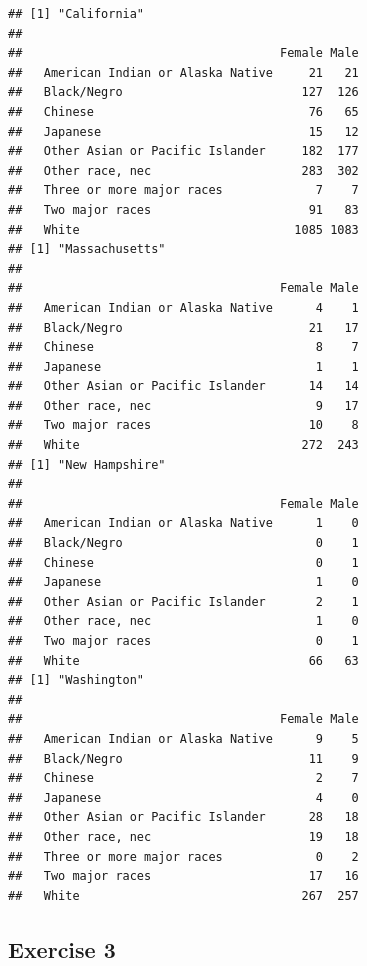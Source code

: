 \documentclass[
]{book}
\theoremstyle{definition}
\theoremstyle{definition}
\theoremstyle{definition}
\theoremstyle{definition}
\theoremstyle{remark}
\begin{document}
\begin{verbatim}
## [1] "California"
##                                   
##                                    Female Male
##   American Indian or Alaska Native     21   21
##   Black/Negro                         127  126
##   Chinese                              76   65
##   Japanese                             15   12
##   Other Asian or Pacific Islander     182  177
##   Other race, nec                     283  302
##   Three or more major races             7    7
##   Two major races                      91   83
##   White                              1085 1083
## [1] "Massachusetts"
##                                   
##                                    Female Male
##   American Indian or Alaska Native      4    1
##   Black/Negro                          21   17
##   Chinese                               8    7
##   Japanese                              1    1
##   Other Asian or Pacific Islander      14   14
##   Other race, nec                       9   17
##   Two major races                      10    8
##   White                               272  243
## [1] "New Hampshire"
##                                   
##                                    Female Male
##   American Indian or Alaska Native      1    0
##   Black/Negro                           0    1
##   Chinese                               0    1
##   Japanese                              1    0
##   Other Asian or Pacific Islander       2    1
##   Other race, nec                       1    0
##   Two major races                       0    1
##   White                                66   63
## [1] "Washington"
##                                   
##                                    Female Male
##   American Indian or Alaska Native      9    5
##   Black/Negro                          11    9
##   Chinese                               2    7
##   Japanese                              4    0
##   Other Asian or Pacific Islander      28   18
##   Other race, nec                      19   18
##   Three or more major races             0    2
##   Two major races                      17   16
##   White                               267  257
\end{verbatim}

\hypertarget{exercise-3}{%
\subsection*{Exercise 3}\label{exercise-3}}
\end{document}
